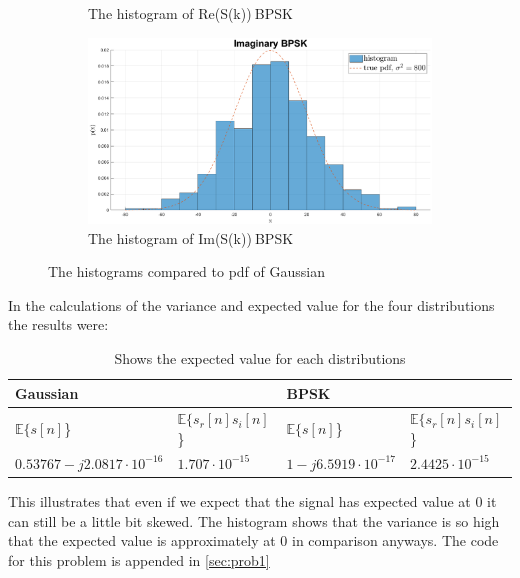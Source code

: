 \begin{figure}[ht]
\begin{subfigure}{.5\textwidth}
        \caption{The histogram of Re(S(k))$~$BPSK}
        \label{fig:re_bpsk}
    \end{subfigure}
    \begin{subfigure}{.5\textwidth}
        \centering
        \includegraphics[width=.8\linewidth]{figures/im_bpsk.eps}
        \caption{The histogram of Im(S(k))$~$BPSK}
        \label{fig:im_bpsk}
    \end{subfigure}
    \caption{The histograms compared to pdf of Gaussian}
    \label{fig:gauss}
\end{figure}
In the calculations of the variance and expected value for the four distributions the results were:
\begin{table}[ht]
\centering
\begin{tabular}{|l|l|l|l|}
\hline
\multicolumn{2}{|l|}{Gaussian} & \multicolumn{2}{|l|}{BPSK}\\ \hline
$\mathbb{E}\{s[n]$\} & $\mathbb{E}\{s_{r}[n]s_{i}[n]$\} & $\mathbb{E}\{s[n]$\} & $\mathbb{E}\{s_{r}[n]s_{i}[n]$\}\\
\hline
$0.53767-j2.0817\cdot10^{-16}$ & $1.707\cdot10^{-15}$ & $1-j6.5919\cdot10^{-17}$ & $2.4425\cdot10^{-15}$\\ 
\hline
\end{tabular}
\caption{Shows the expected value for each distributions}
\end{table}
\newline This illustrates that even if we expect that the signal has expected value at 0 it can still be a little bit skewed. The histogram shows that the variance is so high that the expected value is approximately at 0 in comparison anyways. The code for this problem is appended in \ref{sec:prob1}

